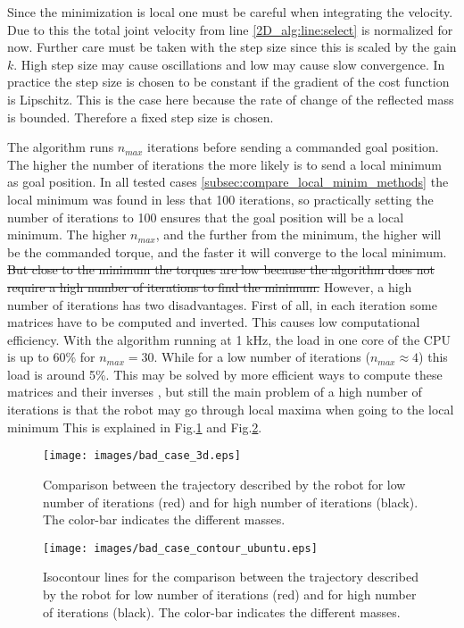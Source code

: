 Since the minimization is local one must be careful when integrating the velocity. Due to this the total joint velocity from  line \ref{2D_alg:line:select} is normalized for now. Further care must be taken with the step size since this is scaled by the gain $k$. High step size may cause oscillations and low may cause slow convergence.  In practice the step size is chosen to be constant if the gradient of the cost function is Lipschitz. This is the case here because the rate of change of the reflected mass is bounded. Therefore a fixed step size is chosen.

The algorithm runs $n_{max}$ iterations before sending a commanded goal position. 
The higher the number of iterations the more likely is to send a local minimum as goal position. In all tested cases   \ref{subsec:compare_local_minim_methods}  the local minimum was found in less that 100 iterations, so practically setting the number of iterations to 100 ensures that the goal position will be a local minimum. The higher $n_{max}$, and the further from the minimum, the higher will be the commanded torque, and the faster it will converge to the local minimum.
\st{But close to the minimum the torques are low because the algorithm does not require a high number of iterations to find the minimum.}  
However, a high number of iterations has two disadvantages. First of all, in each iteration some matrices have to be computed and inverted. This causes low computational efficiency. With the algorithm running at 1 kHz, the load in one core of the CPU is up to 60\% for $n_{max} = 30$. While for a low number of iterations ($n_{max} \approx 4 $) this load is around 5\%. This may be solved by more efficient ways to compute these matrices and their inverses , but still the main problem of a high number of iterations is that the robot may go through local maxima when going to the local minimum This is explained in Fig.\ref{fig:bad_case_3d} and Fig.\ref{fig:bad_case_contour}.


\begin{figure}[!htb]
	\centerline{
		\texttt{[image: images/bad\_case\_3d.eps]}}
	\caption{Comparison between the trajectory described by the robot for low number of iterations (red) and for high number of iterations (black). The color-bar indicates the different masses.}
	\label{fig:bad_case_3d}
\end{figure}
\begin{figure}[!htb]
	\centerline{
		\texttt{[image: images/bad\_case\_contour\_ubuntu.eps]}}
	\caption{Isocontour lines for the comparison between the trajectory described by the robot for low number of iterations (red) and for high number of iterations (black). The color-bar indicates the different masses.}
	\label{fig:bad_case_contour}
\end{figure}

